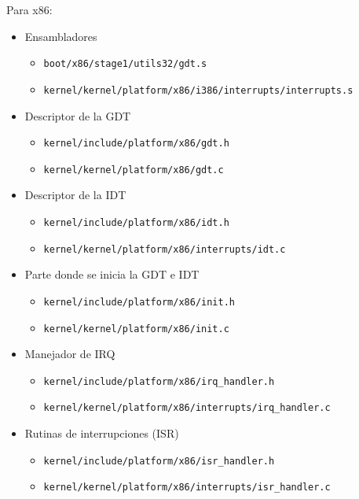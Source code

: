 		Para x86:
		\begin{itemize} \setlength\itemsep{0pt}
			\item Ensambladores
			\begin{itemize} \setlength\itemsep{0pt}
				\item \texttt{boot/x86/stage1/utils32/gdt.s}
				\item \texttt{kernel/kernel/platform/x86/i386/interrupts/interrupts.s}
			\end{itemize}	
		
			\item Descriptor de la GDT
			\begin{itemize} \setlength\itemsep{0pt}
				\item \texttt{kernel/include/platform/x86/gdt.h}
				\item \texttt{kernel/kernel/platform/x86/gdt.c}
			\end{itemize}	
		
			\item Descriptor de la IDT
			\begin{itemize} \setlength\itemsep{0pt}
				\item \texttt{kernel/include/platform/x86/idt.h}
				\item \texttt{kernel/kernel/platform/x86/interrupts/idt.c}
			\end{itemize}
			
			\item Parte donde se inicia la GDT e IDT
			\begin{itemize} \setlength\itemsep{0pt}
				\item \texttt{kernel/include/platform/x86/init.h}
				\item \texttt{kernel/kernel/platform/x86/init.c}
			\end{itemize}	
			
			\item Manejador de IRQ
			\begin{itemize} \setlength\itemsep{0pt}
				\item \texttt{kernel/include/platform/x86/irq\_handler.h}
				\item \texttt{kernel/kernel/platform/x86/interrupts/irq\_handler.c}
			\end{itemize}	
			
			\item Rutinas de interrupciones (ISR)
			\begin{itemize} \setlength\itemsep{0pt}
				\item \texttt{kernel/include/platform/x86/isr\_handler.h}
				\item \texttt{kernel/kernel/platform/x86/interrupts/isr\_handler.c}
			\end{itemize}	
		\end{itemize}
	
